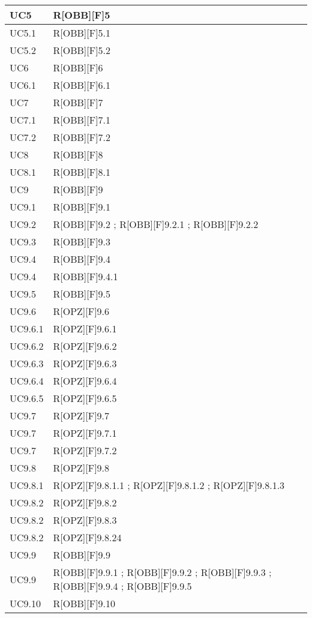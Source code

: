 	\begin{table}[H]
		\centering
		\begin{tabular}{|p{}|p{}|}
			\midrule

			UC5 & R[OBB][F]5 \\ \midrule
			UC5.1 & R[OBB][F]5.1 \\ \midrule
			UC5.2 & R[OBB][F]5.2 \\ \midrule
			UC6 & R[OBB][F]6 \\ \midrule
			UC6.1 & R[OBB][F]6.1 \\ \midrule
			UC7 & R[OBB][F]7 \\ \midrule
			UC7.1 & R[OBB][F]7.1 \\ \midrule
			UC7.2 & R[OBB][F]7.2 \\ \midrule
			UC8 & R[OBB][F]8 \\ \midrule
			UC8.1 & R[OBB][F]8.1 \\ \midrule
			UC9 & R[OBB][F]9 \\ \midrule
			UC9.1 & R[OBB][F]9.1 \\ \midrule
			UC9.2 & R[OBB][F]9.2 ; R[OBB][F]9.2.1 ; R[OBB][F]9.2.2 \\ \midrule
			UC9.3 & R[OBB][F]9.3 \\ \midrule
			UC9.4 & R[OBB][F]9.4 \\ \midrule
			UC9.4 & R[OBB][F]9.4.1 \\ \midrule
			UC9.5 & R[OBB][F]9.5 \\ \midrule
			UC9.6 & R[OPZ][F]9.6 \\ \midrule
			UC9.6.1 & R[OPZ][F]9.6.1 \\ \midrule
			UC9.6.2 & R[OPZ][F]9.6.2 \\ \midrule
			UC9.6.3 & R[OPZ][F]9.6.3 \\ \midrule
			UC9.6.4 & R[OPZ][F]9.6.4 \\ \midrule
			UC9.6.5 & R[OPZ][F]9.6.5 \\ \midrule
			UC9.7 & R[OPZ][F]9.7 \\ \midrule
			UC9.7 & R[OPZ][F]9.7.1 \\ \midrule
			UC9.7 & R[OPZ][F]9.7.2 \\ \midrule
			UC9.8 & R[OPZ][F]9.8 \\ \midrule
			UC9.8.1 & R[OPZ][F]9.8.1.1 ; R[OPZ][F]9.8.1.2 ; R[OPZ][F]9.8.1.3 \\ \midrule
			UC9.8.2 & R[OPZ][F]9.8.2 \\ \midrule
			UC9.8.2 & R[OPZ][F]9.8.3 \\ \midrule
			UC9.8.2 & R[OPZ][F]9.8.24 \\ \midrule
			UC9.9 & R[OBB][F]9.9 \\ \midrule
			UC9.9 & R[OBB][F]9.9.1 ; R[OBB][F]9.9.2 ; R[OBB][F]9.9.3 ; R[OBB][F]9.9.4 ; R[OBB][F]9.9.5 \\ \midrule
			UC9.10 & R[OBB][F]9.10 \\ \midrule

		\end{tabular}
	\end{table}
	\newpage
	
